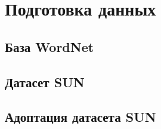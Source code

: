 \section{Подготовка данных}



\subsection{База WordNet}



\subsection{Датасет SUN}



\subsection{Адоптация датасета SUN}
